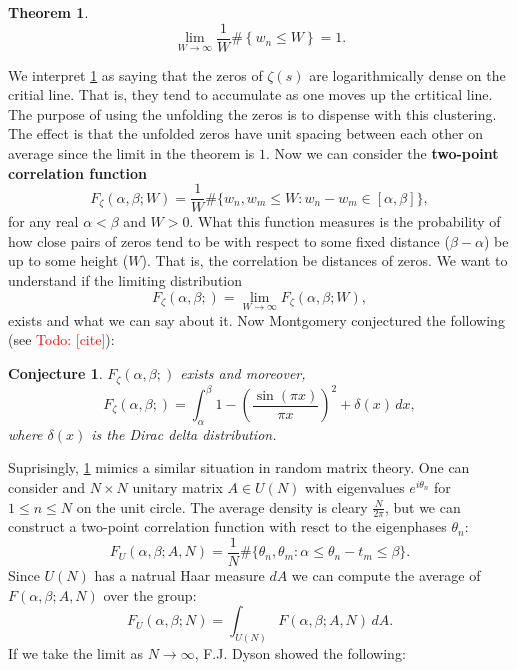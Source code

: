 \documentclass[12pt]{book}
\newtheorem{theorem}{Theorem}[section]
\newtheorem{conjecture}{Conjecture}[section]
\theoremstyle{definition}\newframedtheorem{method}{Method}
\renewcommand{\a}{\alpha}
\renewcommand{\b}{\beta}
\renewcommand{\d}{\delta}
\newcommand{\z}{\zeta}
\renewcommand{\t}{\theta}
\newcommand{\x}{\times}
\newcommand{\<}{\langle}
\renewcommand{\>}{\rangle}
\newcommand{\todo}[1]{\textcolor{red}{\sf Todo: [#1]}}
\begin{document}
      \begin{theorem}\label{thm:zeros_of_zeta_are_log_dense}
      \phantom{ }
      \[
        \lim_{W \to \infty}\frac{1}{W}\#\left\{w_{n} \le W\right\} = 1.
      \]
      \end{theorem}

      We interpret \cref{thm:zeros_of_zeta_are_log_dense} as saying that the zeros of $\z(s)$ are logarithmically dense on the critial line. That is, they tend to accumulate as one moves up the crtitical line. The purpose of using the unfolding the zeros is to dispense with this clustering. The effect is that the unfolded zeros have unit spacing between each other on average since the limit in the theorem is $1$. Now we can consider the \textbf{two-point correlation function}
      \[
        F_{\z}(\a,\b;W) = \frac{1}{W}\#\{w_{n},w_{m} \le W: w_{n}-w_{m} \in [\a,\b]\},
      \]
      for any real $\a < \b$ and $W > 0$. What this function measures is the probability of how close pairs of zeros tend to be with respect to some fixed distance ($\b-\a$) be up to some height ($W$). That is, the correlation be distances of zeros. We want to understand if the limiting distribution
      \[
        F_{\z}(\a,\b;) = \lim_{W \to \infty}F_{\z}(\a,\b;W),
      \]
      exists and what we can say about it. Now Montgomery conjectured the following (see \todo{cite}):

      \begin{conjecture}\label{conj:Montgomery_distribution_of_zeros_of_zeta}
      $F_{\z}(\a,\b;)$ exists and moreover,
      \[
        F_{\z}(\a,\b;) = \int_{\a}^{\b}1-\left(\frac{\sin(\pi x)}{\pi x}\right)^{2}+\d(x)\,dx,
      \]
      where $\d(x)$ is the Dirac delta distribution. 
      \end{conjecture}        
        Suprisingly, \cref{conj:Montgomery_distribution_of_zeros_of_zeta} mimics a similar situation in random matrix theory. One can consider and $N \x N$ unitary matrix $A \in U(N)$ with eigenvalues $e^{i\t_{n}}$ for $1 \le n \le N$ on the unit circle. The average density is cleary $\frac{N}{2\pi}$, but we can construct a two-point correlation function with resct to the eigenphases $\t_{n}$:
      \[
        F_{U}(\a,\b;A,N) = \frac{1}{N}\#\{\t_{n},\t_{m}:\a \le \t_{n}-t_{m} \le \b\}.
      \]
      Since $U(N)$ has a natrual Haar measure $dA$ we can compute the average of $F(\a,\b;A,N)$ over the group:
      \[
        F_{U}(\a,\b;N) = \int_{U(N)}F(\a,\b;A,N)\,dA.
      \]
      If we take the limit as $N \to \infty$, F.J. Dyson showed the following:
\end{document}
